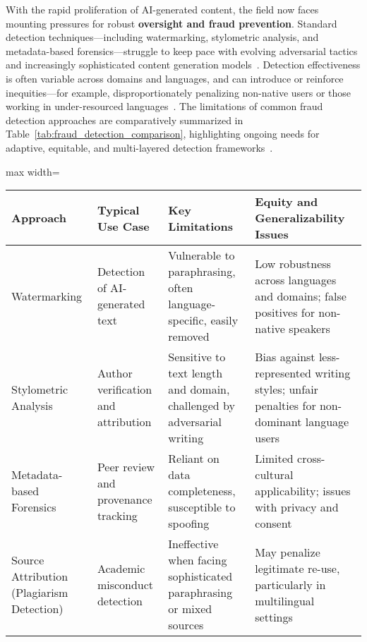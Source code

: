 \documentclass[sigconf]{acmart}
\begin{document}
With the rapid proliferation of AI-generated content, the field now faces mounting pressures for robust \textbf{oversight and fraud prevention}. Standard detection techniques---including watermarking, stylometric analysis, and metadata-based forensics---struggle to keep pace with evolving adversarial tactics and increasingly sophisticated content generation models~\cite{ref76,ref80,ref85,ref104,ref114,ref115,ref117}. Detection effectiveness is often variable across domains and languages, and can introduce or reinforce inequities---for example, disproportionately penalizing non-native users or those working in under-resourced languages~\cite{ref90,ref92,ref97,ref100,ref104,ref112,ref113,ref114,ref95}. The limitations of common fraud detection approaches are comparatively summarized in Table~\ref{tab:fraud_detection_comparison}, highlighting ongoing needs for adaptive, equitable, and multi-layered detection frameworks~\cite{ref95,ref100}. 

\begin{table*}[htbp]
\centering
\caption{Comparative Overview of Automated Fraud Detection Approaches in Academic Workflows}
\label{tab:fraud_detection_comparison}
\begin{adjustbox}{max width=\textwidth}
\begin{tabular}{@{}llll@{}}
\toprule
\textbf{Approach}           & \textbf{Typical Use Case}                  & \textbf{Key Limitations}                                         & \textbf{Equity and Generalizability Issues} \\
\midrule
Watermarking                & Detection of AI-generated text & Vulnerable to paraphrasing, often language-specific, easily removed & Low robustness across languages and domains; false positives for non-native speakers \\
Stylometric Analysis        & Author verification and attribution        & Sensitive to text length and domain, challenged by adversarial writing & Bias against less-represented writing styles; unfair penalties for non-dominant language users \\
Metadata-based Forensics    & Peer review and provenance tracking         & Reliant on data completeness, susceptible to spoofing               & Limited cross-cultural applicability; issues with privacy and consent \\
Source Attribution (Plagiarism Detection) & Academic misconduct detection                & Ineffective when facing sophisticated paraphrasing or mixed sources & May penalize legitimate re-use, particularly in multilingual settings \\
\bottomrule
\end{tabular}
\end{adjustbox}
\end{table*}
\end{document}
